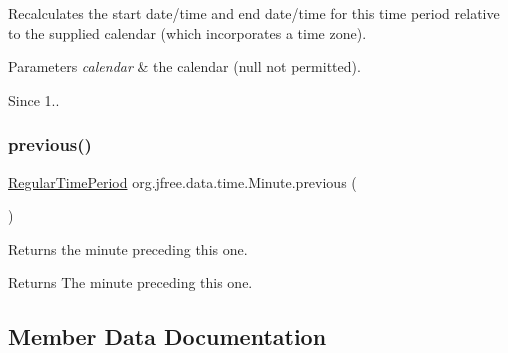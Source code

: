 Recalculates the start date/time and end date/time for this time period relative to the supplied calendar (which incorporates a time zone).


\begin{DoxyParams}{Parameters}
{\em calendar} & the calendar ({\ttfamily null} not permitted).\\
\hline
\end{DoxyParams}
\begin{DoxySince}{Since}
1.. 
\end{DoxySince}
\mbox{\label{classorg_1_1jfree_1_1data_1_1time_1_1_minute_ad15d8cb2c01781598f3675e7d57f801e}} 
\subsubsection{\texorpdfstring{previous()}{previous()}}
{\footnotesize\ttfamily \mbox{\hyperlink{classorg_1_1jfree_1_1data_1_1time_1_1_regular_time_period}{Regular\+Time\+Period}} org.\+jfree.\+data.\+time.\+Minute.\+previous (\begin{DoxyParamCaption}{ }\end{DoxyParamCaption})}

Returns the minute preceding this one.

\begin{DoxyReturn}{Returns}
The minute preceding this one. 
\end{DoxyReturn}


\subsection{Member Data Documentation}
\mbox{\label{classorg_1_1jfree_1_1data_1_1time_1_1_minute_a858e2e398b9a67fdd5e3c91d6e74dc4e}} 
